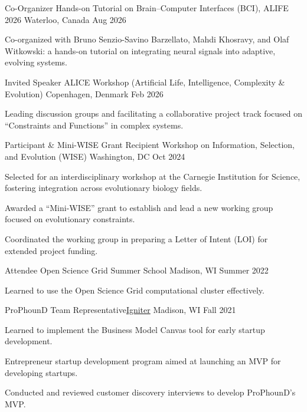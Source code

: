 

\begin{cventries}

\cventry
    {Co-Organizer}
    {Hands-on Tutorial on Brain--Computer Interfaces (BCI), ALIFE 2026}
    {Waterloo, Canada}
    {Aug 2026}
    {
    \begin{cvitems}
        \item {Co-organized with Bruno Senzio-Savino Barzellato, Mahdi Khosravy, and Olaf Witkowski: a hands-on tutorial on integrating neural signals into adaptive, evolving systems.}
    \end{cvitems}
    }

\cventry
    {Invited Speaker}
    {ALICE Workshop (Artificial Life, Intelligence, Complexity \& Evolution)}
    {Copenhagen, Denmark}
    {Feb 2026}
    {
    \begin{cvitems}
        \item {Leading discussion groups and facilitating a collaborative project track focused on ``Constraints and Functions'' in complex systems.}
    \end{cvitems}
    }

\cventry
    {Participant \& Mini-WISE Grant Recipient}
    {Workshop on Information, Selection, and Evolution (WISE)}
    {Washington, DC}
    {Oct 2024}
    {
    \begin{cvitems}
        \item {Selected for an interdisciplinary workshop at the Carnegie Institution for Science, fostering integration across evolutionary biology fields.}
        \item {Awarded a ``Mini-WISE'' grant to establish and lead a new working group focused on evolutionary constraints.}
        \item {Coordinated the working group in preparing a Letter of Intent (LOI) for extended project funding.}
    \end{cvitems}
    }

\cventry
    {Attendee}
    {Open Science Grid Summer School}
    {Madison, WI}
    {Summer 2022}
    {
    \begin{cvitems}
        \item {Learned to use the Open Science Grid computational cluster effectively.}
    \end{cvitems}
    }
    
\cventry
    {ProPhounD Team Representative}{\href{https://d2p.wisc.edu/programs/igniter/}{Igniter}}
    {Madison, WI}
    {Fall 2021}
    {
    \begin{cvitems}
        \item {Learned to implement the Business Model Canvas tool for early startup development.}
       \item {Entrepreneur startup development program aimed at launching an MVP for developing startups.}
       \item {Conducted and reviewed customer discovery interviews to develop ProPhounD's MVP.}
    \end{cvitems}
    }
    

\end{cventries}
